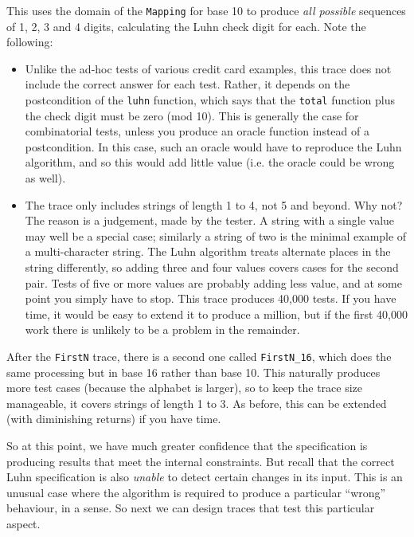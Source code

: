 \documentclass{overturerepchap}
\begin{document}
\noindent This uses the domain of the \texttt{Mapping} for base 10 to produce
\emph{all possible} sequences of 1, 2, 3 and 4 digits, calculating the Luhn
check digit for each. Note the following:

\begin{itemize}
	\item Unlike the ad-hoc tests of various credit card examples, this trace does
	not include the correct answer for each test. Rather, it depends on the
	postcondition of the \texttt{luhn} function, which says that the \texttt{total}
	function plus the check digit must be zero (mod 10). This is generally the case
	for combinatorial tests, unless you produce an oracle function instead of a
	postcondition. In this case, such an oracle would have to reproduce the Luhn
	algorithm, and so this would add little value (i.e. the oracle could be wrong
	as well).
	\item The trace only includes strings of length 1 to 4, not 5 and beyond. Why
	not? The reason is a judgement, made by the tester. A string with a single value
	may well be a special case; similarly a string of two is the minimal example of
	a multi-character string. The Luhn algorithm treats alternate places in the
	string differently, so adding three and four values covers cases for the second
	pair. Tests of five or more values are probably adding less value, and at
	some point you simply have to stop. This trace produces 40,000 tests. If you
	have time, it would be easy to extend it to produce a million, but if the first
	40,000 work there is unlikely to be a problem in the remainder.
\end{itemize}

\noindent After the \texttt{FirstN} trace, there is a second one called
\texttt{FirstN\_16}, which does the same processing but in base 16 rather than
base 10. This naturally produces more test cases (because the alphabet is
larger), so to keep the trace size manageable, it covers strings of length 1 to
3. As before, this can be extended (with diminishing returns) if you have time.

So at this point, we have much greater confidence that the specification is
producing results that meet the internal constraints. But recall that the
correct Luhn specification is also \emph{unable} to detect certain changes in
its input. This is an unusual case where the algorithm is required to produce a
particular ``wrong'' behaviour, in a sense. So next we can design traces that
test this particular aspect.
\end{document}
